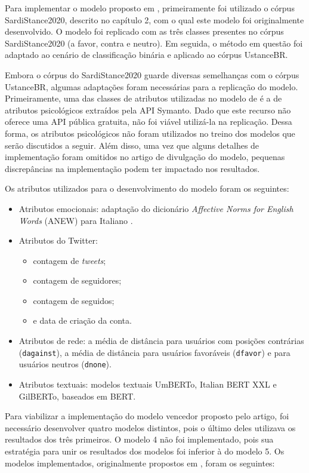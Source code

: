 \documentclass[
	12pt, oneside, a4paper, english, brazil
]{abntex2ppgsi}
\begin{document}
Para implementar o modelo proposto em , primeiramente foi utilizado o córpus SardiStance2020, descrito no capítulo 2, com o qual este modelo foi originalmente desenvolvido. O modelo foi replicado com as três classes presentes no córpus SardiStance2020 (a favor, contra e neutro). Em seguida, o método em questão foi adaptado ao cenário de classificação binária e aplicado ao córpus UstanceBR.

Embora o córpus do SardiStance2020 guarde diversas semelhanças com o córpus UstanceBR, algumas adaptações foram necessárias para a replicação do modelo. Primeiramente, uma das classes de atributos utilizadas no modelo de  é a de atributos psicológicos extraídos pela API Symanto. Dado que este recurso não oferece uma API pública gratuita, não foi viável utilizá-la na replicação. Dessa forma, os atributos psicológicos não foram utilizados no treino dos modelos que serão discutidos a seguir. Além disso, uma vez que alguns detalhes de implementação foram omitidos no artigo de divulgação do modelo, pequenas discrepâncias na implementação podem ter impactado nos resultados.

Os atributos utilizados para o desenvolvimento do modelo foram os seguintes:
\begin{itemize}
  \item Atributos emocionais: adaptação do dicionário {\em Affective Norms for English Words} (ANEW) para Italiano \cite{anew}.
  \item Atributos do Twitter:
  \begin{itemize}
    \item contagem de {\em tweets};
    \item contagem de seguidores;
    \item contagem de seguidos;
    \item e data de criação da conta.
  \end{itemize}
  \item Atributos de rede: a média de distância para usuários com posições contrárias (\texttt{dagainst}), a média de distância para usuários favoráveis (\texttt{dfavor}) e para usuários neutros (\texttt{dnone}).
  \item Atributos textuais: modelos textuais UmBERTo, Italian BERT XXL e GilBERTo, baseados em BERT.
\end{itemize}

Para viabilizar a implementação do modelo vencedor proposto pelo artigo, foi necessário desenvolver quatro modelos distintos, pois o último deles utilizava os resultados dos três primeiros. O modelo 4 não foi implementado, pois sua estratégia para unir os resultados dos modelos foi inferior à do modelo 5. Os modelos implementados, originalmente propostos em , foram os seguintes:
\end{document}
